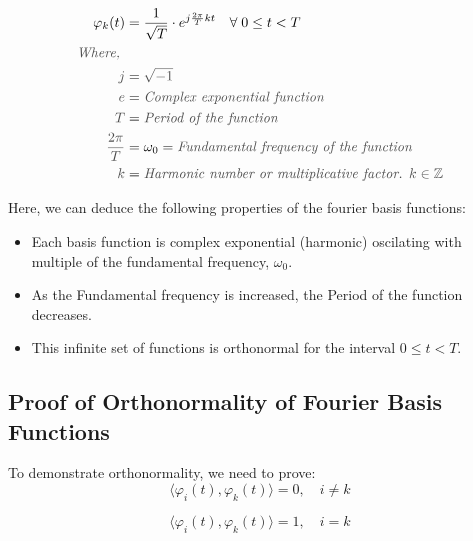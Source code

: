 \documentclass[letterpaper,12pt]{article}
\newcommand{\annot}[1]{\textcolor{darkgray}{\textit{#1}}}
\begin{document}
\begin{align*}
    \varphi_{k}(t)            & = \frac{1}{\sqrt{T}}\cdot e^{j\frac{2\pi}{T}k t} \quad \forall \; 0 \leq t < T \\
    \annot{Where, }                                                                                            \\
    \annot{$j$}               & = \annot{$\sqrt{-1}$}                                                          \\
    \annot{$e$}               & = \annot{Complex exponential function}                                         \\
    \annot{$T$}               & = \annot{Period of the function}
    \\
    \annot{$\frac{2 \pi}{T}$} & = \omega_{0} = \annot{Fundamental frequency of the function}
    \\
    \annot{$k$}               & = \annot{Harmonic number or multiplicative factor. $k \in\mathbb{Z}$}
\end{align*}

Here, we can deduce the following properties of the fourier basis functions:

\begin{itemize}
    \item Each basis function is complex exponential (harmonic) oscilating with multiple
          of the fundamental frequency, $\omega_{0}$.
    \item As the Fundamental frequency is increased, the Period of the function
          decreases.
    \item This infinite set of functions is orthonormal for the interval $0 \leq t < T$.
\end{itemize}

\subsection{Proof of Orthonormality of Fourier Basis Functions}
To demonstrate orthonormality, we need to prove:
\[\langle \varphi_{i}(t), \varphi_{k}(t) \rangle = 0, \quad i\neq k \]

\[\langle \varphi_{i}(t), \varphi_{k}(t) \rangle = 1, \quad i = k \]
\end{document}
